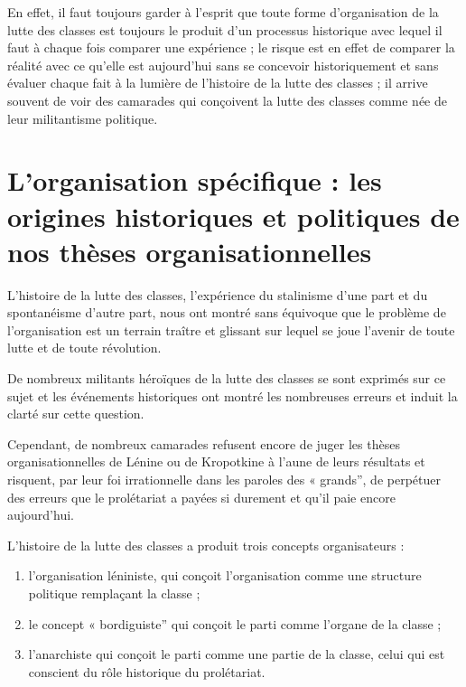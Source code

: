 En effet, il faut toujours garder à l'esprit que toute forme d'organisation de la lutte des classes est toujours le produit d'un processus historique avec lequel il faut à chaque fois comparer une expérience ; le risque est en effet de comparer la réalité avec ce qu'elle est aujourd'hui sans se concevoir historiquement et sans évaluer chaque fait à la lumière de l'histoire de la lutte des classes ; il arrive souvent de voir des camarades qui conçoivent la lutte des classes comme née de leur militantisme politique.

\chapter{L'organisation spécifique : les origines historiques et politiques de nos thèses organisationnelles}\hypertarget{lorganisation-spcifique--les-origines-historiques-et-politiques-de-nos-thses-organisationnelles}{}\label{lorganisation-spcifique--les-origines-historiques-et-politiques-de-nos-thses-organisationnelles}

L'histoire de la lutte des classes, l'expérience du stalinisme d'une part et du spontanéisme d'autre part, nous ont montré sans équivoque que le problème de l'organisation est un terrain traître et glissant sur lequel se joue l'avenir de toute lutte et de toute révolution.

De nombreux militants héroïques de la lutte des classes se sont exprimés sur ce sujet et les événements historiques ont montré les nombreuses erreurs et induit la clarté sur cette question.

Cependant, de nombreux camarades refusent encore de juger les thèses organisationnelles de Lénine ou de Kropotkine à l'aune de leurs résultats et risquent, par leur foi irrationnelle dans les paroles des « grands'', de perpétuer des erreurs que le prolétariat a payées si durement et qu'il paie encore aujourd'hui.

L'histoire de la lutte des classes a produit trois concepts organisateurs :

\begin{enumerate}
\item{} l'organisation léniniste, qui conçoit l'organisation comme une structure politique remplaçant la classe ;
\item{} le concept « bordiguiste'' qui conçoit le parti comme l'organe de la classe ;
\item{} l'anarchiste qui conçoit le parti comme une partie de la classe, celui qui est conscient du rôle historique du prolétariat.
\end{enumerate}

